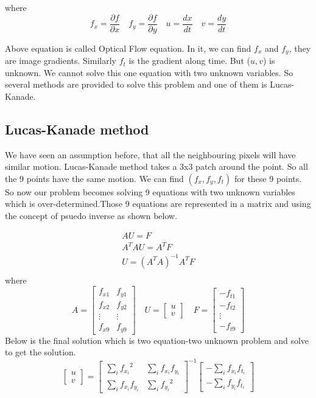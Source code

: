 where 
    \[f_{x}=\frac{\partial f}{\partial x} \quad f_{y}=\frac{\partial f}{\partial y} \quad u=\frac{dx}{dt}\quad v=\frac{dy}{dt}\]

Above equation is called Optical Flow equation. In it, we can find \(f_{x}\) and \(f_{y}\), they are image gradients. Similarly \(f_{t}\) is the gradient along time. But ($u,v$) is unknown. We cannot solve this one equation with two unknown variables. So several methods are provided to solve this problem and one of them is Lucas-Kanade.


\subsection{Lucas-Kanade method}
We have seen an assumption before, that all the neighbouring pixels will have similar motion. Lucas-Kanade method takes a 3x3 patch around the point. So all the 9 points have the same motion. We can find $(f_{x},f_{y},f_{t})$ for these 9 points. So now our problem becomes solving 9 equations with two unknown variables which is over-determined.Those 9 equations are represented in a matrix and using the concept of psuedo inverse as shown below.

\begin{align*}
    AU = F\\
    A^{T}AU = A^{T}F\\
    U = (A^{T}A)^{-1}A^{T}F\\
\end{align*}
where
\[
A = \begin{bmatrix}
f_{x1} & f_{y1} \\
f_{x2} & f_{y2} \\
\vdots & \vdots \\
f_{x9} & f_{y9} 

\end{bmatrix} \quad
U = \begin{bmatrix}
u\\
v
\end{bmatrix} \quad
F = \begin{bmatrix}
-f_{t1}\\
-f_{t2}\\
\vdots\\
-f_{t9}
\end{bmatrix}
\]
Below is the final solution which is two equation-two unknown problem and solve to get the solution.
\[
\begin{bmatrix}
u \\ v \end{bmatrix} = \begin{bmatrix} \sum_{i}{f_{x_i}}^2 & \sum_{i}{f_{x_i} f_{y_i} } \\ \sum_{i}{f_{x_i} f_{y_i}} & \sum_{i}{f_{y_i}}^2 \end{bmatrix}^{-1} \begin{bmatrix} - \sum_{i}{f_{x_i} f_{t_i}} \\ - \sum_{i}{f_{y_i} f_{t_i}} \end{bmatrix}\]


